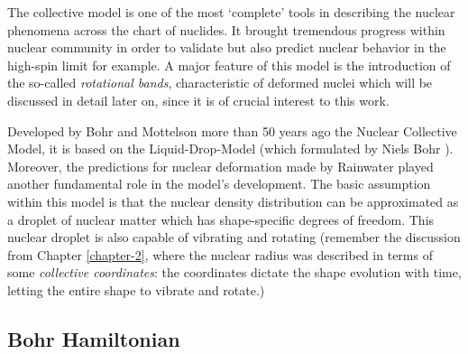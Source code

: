 The collective model is one of the most `complete' tools in describing the nuclear phenomena across the chart of nuclides. It brought tremendous progress within nuclear community in order to validate but also predict nuclear behavior in the high-spin limit for example. A major feature of this model is the introduction of the so-called \emph{rotational bands}, characteristic of deformed nuclei which will be discussed in detail later on, since it is of crucial interest to this work.

Developed by Bohr and Mottelson \cite{bohr1953collective,bohr1998nuclear} more than 50 years ago the Nuclear Collective Model, it is based on the Liquid-Drop-Model (which formulated by Niels Bohr \cite{bohr1936neutron}). Moreover, the predictions for nuclear deformation made by Rainwater \cite{rainwater1950nuclear} played another fundamental role in the model's development. The basic assumption within this model is that the nuclear density distribution can be approximated as a droplet of nuclear matter which has shape-specific degrees of freedom. This nuclear droplet is also capable of vibrating and rotating (remember the discussion from Chapter \ref{chapter-2}, where the nuclear radius was described in terms of some \emph{collective coordinates}: the coordinates dictate the shape evolution with time, letting the entire shape to vibrate and rotate.)

\subsection{Bohr Hamiltonian}

